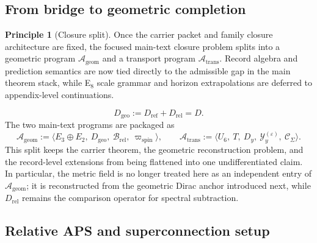 \documentclass[11pt,a4paper]{article}
\theoremstyle{definition}
\newtheorem{principle}[theorem]{Principle}
\theoremstyle{remark}
\newcommand{\Seam}{\Sigma}
\newcommand{\Ageom}{\mathcal A_{\mathrm{geom}}}
\newcommand{\Atrans}{\mathcal A_{\mathrm{trans}}}
\newcommand{\wspin}{\varpi_{\mathrm{spin}}}
\begin{document}
\subsection{From bridge to geometric completion}

\begin{principle}[Closure split]
Once the carrier packet and family closure architecture are fixed, the focused main-text closure
problem splits into a geometric program $\Ageom$ and a transport program $\Atrans$. Record
algebra and prediction semantics are now tied directly to the admissible gap in the main theorem
stack, while E$_8$ scale grammar and horizon extrapolations are deferred to appendix-level
continuations.
\end{principle}

\[
D_{\mathrm{geo}}:=D_{\mathrm{ref}}+D_{\mathrm{rel}}=D.
\]
The two main-text programs are packaged as
\[
\Ageom
:=
\langle E_3\oplus E_2,\ D_{\mathrm{geo}},\ \mathcal B_{\mathrm{rel}},\ \wspin\rangle,
\qquad
\Atrans
:=
\langle U_6,\ T,\ D_y,\ \mathcal Y_y^{(\varepsilon)},\ \mathcal C_{\Seam}\rangle.
\]
This split keeps the carrier theorem, the geometric reconstruction problem, and the record-level extensions from being flattened into one undifferentiated claim. In particular, the metric field is no longer treated here as an independent entry of $\Ageom$; it is reconstructed from the geometric Dirac anchor introduced next, while $D_{\mathrm{rel}}$ remains the comparison operator for spectral subtraction.

\subsection{Relative APS and superconnection setup}
\end{document}
